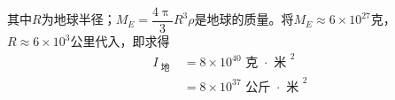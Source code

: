 其中$ R $为地球半径；$ M _ { E } = \dfrac { 4 \uppi } { 3 } R ^ { 3 } \rho $是地球的质量。将$  M _ { E } \approx
6 \times 1 0 ^ { 2 7 }  $克， $ R \approx 6 \times 1 0 ^ { 3 }   $公里代入，即求得
\begin{equation*}
    \begin{split}
        I _ { \text { 地 } } &= 8 \times 1 0 ^ { 40 }  \text{ 克 }\! \cdot\!\!\text{ 米 } ^ 2 \\
        &= 8 \times 1 0 ^ { 37 } \text{ 公斤 }\! \cdot\!\! \text{ 米 } ^ 2
    \end{split}
\end{equation*}